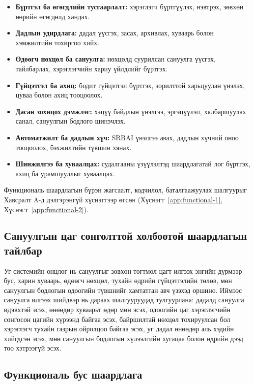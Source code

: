 \begin{itemize}
    \item \textbf{Бүртгэл ба өгөгдлийн тусгаарлалт:} хэрэглэгч бүртгүүлэх, нэвтрэх, зөвхөн өөрийн өгөгдөлд хандах.
    \item \textbf{Дадлын удирдлага:} дадал үүсгэх, засах, архивлах, хуваарь болон хэмжилтийн тохиргоо хийх.
    \item \textbf{Өдөөгч нөхцөл ба сануулга:} нөхцөлд суурилсан сануулга үүсгэх, тайлбарлах, хэрэглэгчийн хариу үйлдлийг бүртгэх.
    \item \textbf{Гүйцэтгэл ба ахиц:} бодит гүйцэтгэл бүртгэх, зорилттой харьцуулан үнэлэх, цуваа болон ахиц тооцоолох.
    \item \textbf{Дасан зохицох дэмжлэг:} хэцүү байдлын үнэлгээ, эргэцүүлэл, хялбаршуулах санал, сануулгын бодлого шинэчлэх.
    \item \textbf{Автоматжилт ба дадлын хүч:} SRBAI үнэлгээ авах, дадлын хүчний оноо тооцоолох, бэхжилтийн түвшин хянах.
    \item \textbf{Шинжилгээ ба хуваалцах:} судалгааны үзүүлэлтэд шаардлагатай лог бүртгэх, ахиц ба урамшууллыг хуваалцах.
\end{itemize}

Функциональ шаардлагын бүрэн жагсаалт, кодчилол, баталгаажуулах шалгуурыг Хавсралт A-д дэлгэрэнгүй хүснэгтээр өгсөн (Хүснэгт~\ref{app:functional-1}, Хүснэгт~\ref{app:functional-2}).

\subsection{Сануулгын цаг сонголттой холбоотой шаардлагын тайлбар}

Уг системийн онцлог нь сануулгыг зөвхөн тогтмол цагт илгээх энгийн дүрмээр бус, харин хуваарь, өдөөгч нөхцөл, тухайн өдрийн гүйцэтгэлийн төлөв, мөн сануулгын бодлогын одоогийн түвшнийг хамтатган авч үзэхэд оршино. Иймээс сануулга илгээх шийдвэр нь дараах шалгууруудад тулгуурлана: дадалд сануулга идэвхтэй эсэх, өнөөдөр хуваарьт өдөр мөн эсэх, одоогийн цаг хэрэглэгчийн сонгосон цагийн хүрээнд байгаа эсэх, байршилтай нөхцөл тохируулсан бол хэрэглэгч тухайн газрын ойролцоо байгаа эсэх, уг дадал өнөөдөр аль хэдийн хийгдсэн эсэх, мөн сануулгын бодлогын хүлээлгийн хугацаа болон өдрийн дээд тоо хэтрээгүй эсэх.

\subsection{Функциональ бус шаардлага}

